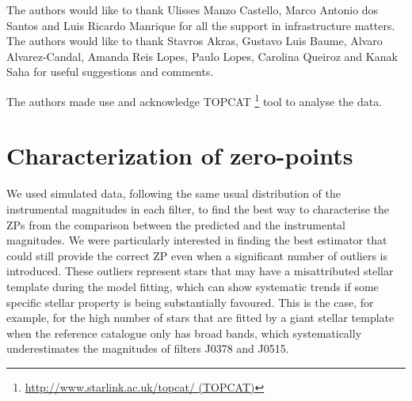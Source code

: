 \documentclass[fleqn,usenatbib]{mnras}
\begin{document}
The authors  would like to thank Ulisses Manzo Castello, Marco Antonio dos Santos and Luis Ricardo Manrique for all the support in infrastructure matters. The authors would like to thank Stavros Akras, Gustavo Luis Baume, Alvaro Alvarez-Candal, Amanda Reis Lopes, Paulo Lopes, Carolina Queiroz and Kanak Saha for useful suggestions and comments.

The authors made use and acknowledge TOPCAT \footnote{\url{http://www.starlink.ac.uk/topcat/ (TOPCAT)}} tool to analyse the data.









\appendix

\section{Characterization of zero-points}
\label{ap:zp_characterization}

We used simulated data, following the same usual distribution of the instrumental magnitudes in each filter, to find the best way to characterise the ZPs from the comparison between the predicted and the instrumental magnitudes. We were particularly interested in finding the best estimator that could still provide the correct ZP even when a significant number of outliers is introduced. These outliers represent stars that may have a misattributed stellar template during the model fitting, which can show systematic trends if some specific stellar property is being substantially favoured. This is the case, for example, for the high number of stars that are fitted by a giant stellar template when the reference catalogue only has broad bands, which systematically underestimates the magnitudes of filters J0378 and J0515. 
\end{document}
